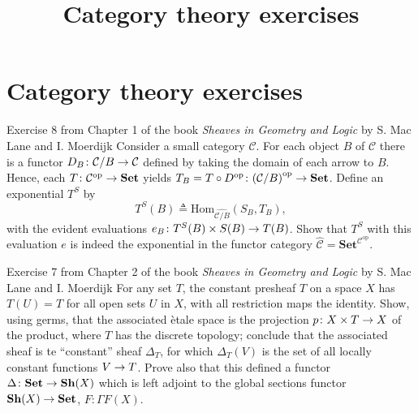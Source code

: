\documentclass[a4paper]{article}
\title{Category theory exercises}
\author{}
\date{}
\begin{document}
\maketitle
\tableofcontents

\section{Category theory exercises}

\begin{snippetexercise}{Exercise 8 from Chapter 1 of the book \emph{Sheaves in Geometry and Logic} by S. Mac Lane and I. Moerdijk}
    Consider a small category \(\mathcal C\). For each object \(B\)
    of \(\mathcal C\) there is a functor \(D_B \colon \mathcal C/B \to \mathcal C\) defined by taking the domain
    of each arrow to \(B\). Hence, each \(T \colon \mathcal C^{\text{op}} \to \mathbf{Set}\) yields
    \(T_B = T \circ D^{\text{op}} \colon {(\mathcal C/B)}^{\text{op}} \to \mathbf{Set}\).
    Define an exponential \(T^S\) by
    \[
        T^S(B) \triangleq \text{Hom}_{\widehat{\mathcal C/B}}(S_B, T_B),
    \]
    with the evident evaluations \(e_B \colon T^S(B) \times S(B) \to T(B)\).
    Show that \(T^S\) with this evaluation \(e\) is indeed the exponential in the functor
    category \(\widehat{\mathcal C} = {\mathbf{Set}}^{\mathcal C^{\text{op}}}\).
\end{snippetexercise}

\begin{snippetexercise}{Exercise 7 from Chapter 2 of the book \emph{Sheaves in Geometry and Logic} by S. Mac Lane and I. Moerdijk}
    For any set \(T\), the constant presheaf \(T\) on a space \(X\) has
    \(T(U) = T\) for all open sets \(U\) in \(X\), with all restriction maps the identity.
    Show, using germs, that the associated ètale space is the projection \(p \colon X \times T \to X\) of the
    product, where \(T\) has the discrete topology; conclude that the associated sheaf is te ``constant''
    sheaf \(\Delta_T\), for which \(\Delta_T(V)\) is the set of all locally constant functions
    \(V \to T\). Prove also that this defined a functor \(\Delta \colon \mathbf{Set} \to \mathbf{Sh}(X)\)
    which is left adjoint to the global sections functor \(\mathbf{Sh}(X) \to \mathbf{Set}\),
    \(F \colon \Gamma F(X)\).
\end{snippetexercise}
\end{document}
